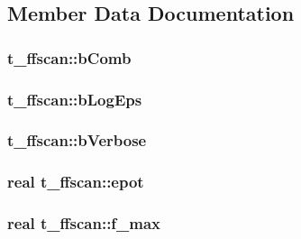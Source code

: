 \subsection{\-Member \-Data \-Documentation}
\hypertarget{structt__ffscan_ada11744647131608d024bce2e994cfbe}{
\subsubsection[{b\-Comb}]{ {\bf t\-\_\-ffscan\-::b\-Comb}}}\label{structt__ffscan_ada11744647131608d024bce2e994cfbe}
\hypertarget{structt__ffscan_a3a6f9d4795dbd6305709048ca62528be}{
\subsubsection[{b\-Log\-Eps}]{ {\bf t\-\_\-ffscan\-::b\-Log\-Eps}}}\label{structt__ffscan_a3a6f9d4795dbd6305709048ca62528be}
\hypertarget{structt__ffscan_abeb6fec4f45e4fd21194cc61ec4845e4}{
\subsubsection[{b\-Verbose}]{ {\bf t\-\_\-ffscan\-::b\-Verbose}}}\label{structt__ffscan_abeb6fec4f45e4fd21194cc61ec4845e4}
\hypertarget{structt__ffscan_a08ce813c4a5e6a93a0e6f82204537004}{
\subsubsection[{epot}]{\setlength{\rightskip}{0pt plus 5cm}real {\bf t\-\_\-ffscan\-::epot}}}\label{structt__ffscan_a08ce813c4a5e6a93a0e6f82204537004}
\hypertarget{structt__ffscan_a483784f12c3d517bb4541f60edf55f96}{
\subsubsection[{f\-\_\-max}]{\setlength{\rightskip}{0pt plus 5cm}real {\bf t\-\_\-ffscan\-::f\-\_\-max}}}\label{structt__ffscan_a483784f12c3d517bb4541f60edf55f96}
